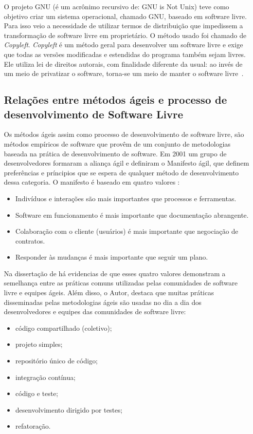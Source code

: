 O projeto GNU (é um acrônimo recursivo de: GNU is Not Unix) teve como objetivo criar um sistema operacional, chamado GNU, baseado em software livre. Para isso veio a necessidade de utilizar termos de distribuição que impedissem a transformação de software livre em proprietário. O método usado foi chamado de \emph{Copyleft}. \emph{Copyleft} é um método geral para desenvolver um software livre e exige que todas as versões modificadas e estendidas do programa também sejam livres. Ele utiliza lei de direitos autorais, com finalidade diferente da usual: ao invés de um meio de privatizar o software, torna-se um meio de manter o software livre~\cite{stallman2009}.

\subsection{Relações entre métodos ágeis e processo de desenvolvimento de Software Livre}
\label{des-soft-livre}

Os métodos ágeis assim como processo de desenvolvimento de software livre, são métodos empíricos de software que provêm de um conjunto de metodologias baseada na prática de desenvolvimento de software. Em 2001 um grupo de desenvolvedores formaram a aliança ágil e definiram o Manifesto ágil, que definem preferências e príncipios que se espera de qualquer método de desenvolvimento dessa categoria. O manifesto é baseado em quatro valores \cite{beck2001agile}:
\begin{itemize}
\item Indivíduos e interações são mais importantes que processos e ferramentas.
\item Software em funcionamento é mais importante que documentação abrangente.
\item Colaboração com o cliente (usuários) é mais importante que negociação de contratos.
\item Responder às mudanças é mais importante que seguir um plano.
\end{itemize}

Na dissertação de  há evidencias de que esses quatro valores demonstram a semelhança entre as práticas comuns utilizadas pelas comunidades de software livre e equipes ágeis. Além disso, o Autor, destaca que muitas práticas disseminadas pelas metodologias ágeis são usadas no dia a dia dos desenvolvedores e equipes das comunidades de software livre:
\begin{itemize}
\item código compartilhado (coletivo);
\item projeto simples;
\item repositório único de código;
\item integração contínua;
\item código e teste;
\item desenvolvimento dirigido por testes;
\item refatoração.
\end{itemize}

